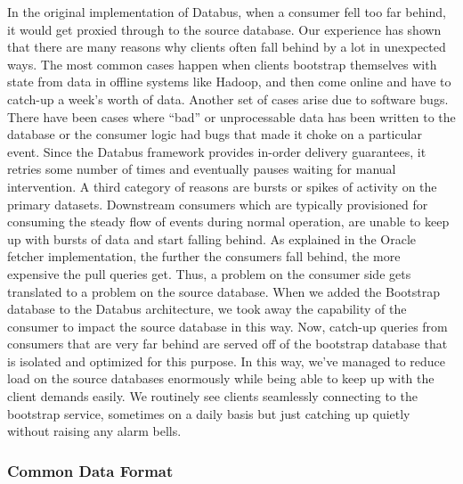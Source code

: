 In the original implementation of Databus, when a consumer fell too far behind, it would get proxied through to the source database. Our experience has shown that there are many reasons why clients often fall behind by a lot in unexpected ways. The most common cases happen when clients bootstrap themselves with state from data in offline systems like Hadoop, and then come online and have to catch-up a week's worth of data. Another set of cases arise due to software bugs. There have been cases where ``bad'' or unprocessable data has been written to the database or the consumer logic had bugs that made it choke on a particular event. Since the Databus framework provides in-order delivery guarantees, it retries some number of times and eventually pauses waiting for manual intervention. 
A third category of reasons are bursts or spikes of activity on the primary datasets. Downstream consumers which are typically provisioned for consuming the steady flow of events during normal operation, are unable to keep up with bursts of data and start falling behind. As explained in the Oracle fetcher implementation, the further the consumers fall behind, the more expensive the pull queries get. Thus, a problem on the consumer side gets translated to a problem on the source database. When we added the Bootstrap database to the Databus architecture, we took away the capability of the consumer to impact the source database in this way. Now, catch-up queries from consumers that are very far behind are served off of the bootstrap database that is isolated and optimized for this purpose. In this way, we've managed to reduce load on the source databases enormously while being able to keep up with the client demands easily.  We routinely see clients seamlessly connecting to the bootstrap service, sometimes on a daily basis but just catching up quietly without raising any alarm bells. 

\subsubsection{Common Data Format}

